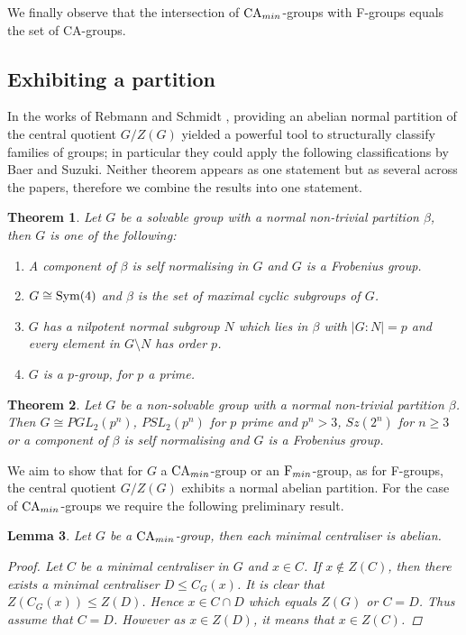 \documentclass[a4paper,11pt]{article}
\theoremstyle{plain}
\newtheorem{thm}{Theorem}[section]
\newtheorem{lm}[thm]{Lemma}
\numberwithin{thm}{section}
\begin{document}
We finally observe that the intersection of ${\rm CA}_{min}$-groups with F-groups equals the set of CA-groups. 

\subsection{Exhibiting a partition}

In the works of Rebmann and Schmidt \cite{FGroups}, \cite{SchmidtCaGps} providing an abelian normal partition of the central quotient $G/Z(G)$ yielded a powerful tool to structurally classify families of groups; in particular they could apply the following classifications by Baer and Suzuki.
Neither theorem appears as one statement but as several across the papers, therefore we combine the results into one statement.

\begin{thm}\cite{BaerPart1}\cite{BaerPart2}\label{BaerSolPart}
Let $G$ be a solvable group with a normal non-trivial partition $\beta$, then $G$ is one of the following:
\begin{enumerate}
\item A component of $\beta$ is self normalising in $G$ and $G$ is a Frobenius group.
\item $G\cong {\rm Sym}(4)$ and $\beta$ is the set of maximal cyclic subgroups of $G$.
\item $G$ has a nilpotent normal subgroup $N$ which lies in $\beta$ with $|G:N|=p$ and every element in $G\setminus N$ has order $p$.
\item $G$ is a $p$-group, for $p$ a prime.
\end{enumerate}
\end{thm}

\begin{thm}\cite{SuzPart}\label{SuzNonSolPart}
Let $G$ be a non-solvable group with a normal non-trivial partition $\beta$.
Then $G\cong PGL_2(p^n)$, $PSL_2(p^n)$ for $p$ prime and $p^n>3$, $Sz(2^n)$ for $n\geq 3$ or a component of $\beta$ is self normalising and $G$ is a Frobenius group.
\end{thm}

We aim to show that for $G$ a ${\rm CA}_{min}$-group or an ${\rm F}_{min}$-group, as for F-groups, the central quotient $G/Z(G)$ exhibits a normal abelian partition.
For the case of ${\rm CA}_{min}$-groups we require the following preliminary result.

\begin{lm}\label{CAminCenAb}
Let $G$ be a ${\rm CA}_{min}$-group, then each minimal centraliser is abelian.
\begin{proof}
Let $C$ be a minimal centraliser in $G$ and $x\in C$.
If $x\not\in Z(C)$, then there exists a minimal centraliser $D \leq C_G(x)$.
It is clear that $Z(C_G(x))\leq Z(D)$.
Hence $x\in C\cap D$ which equals $Z(G)$ or $C=D$.
Thus assume that $C=D$.
However as $x\in Z(D)$, it means that $x\in Z(C)$.
\end{proof}
\end{lm}
\end{document}
